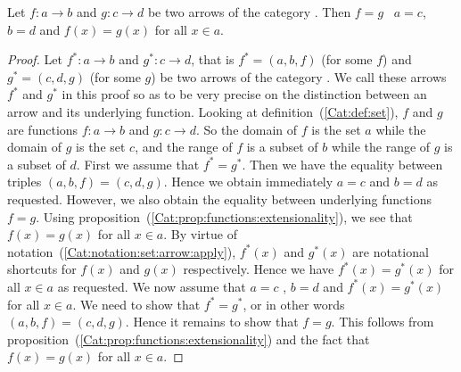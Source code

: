 \begin{prop}\label{Cat:prop:set:arrow:equal}
    Let $f:a\to b$ and $g:c\to d$ be two arrows of the category \Set. Then 
    $f=g$ \ifand\ $a=c$, $b=d$ and $f(x)=g(x)$ for all $x\in a$.
\end{prop}
\begin{proof}
    Let $f^{*}:a \to b$ and $g^{*}:c \to d$, that is $f^{*}=(a,b,f)$ 
    (for some $f$) and $g^{*}=(c,d,g)$ (for some $g$) be two arrows
    of the category \Set. We call these arrows $f^{*}$ and $g^{*}$ in
    this proof so as to be very precise on the distinction between
    an arrow and its underlying function. Looking at 
    definition~(\ref{Cat:def:set}), $f$ and $g$ are functions $f:a\to b$ 
    and $g:c\to d$. So the domain of $f$ is the set $a$ while the domain of $g$ 
    is the set $c$, and the range of $f$ is a subset of $b$ while the range of 
    $g$ is a subset of $d$. First we assume that $f^{*}=g^{*}$. Then we have 
    the equality between triples $(a,b,f)=(c,d,g)$. Hence we obtain immediately
    $a=c$ and $b=d$ as requested. However, we also obtain the equality
    between underlying functions $f=g$. Using 
    proposition~(\ref{Cat:prop:functions:extensionality}), we see
    that $f(x)=g(x)$ for all $x\in a$. By virtue of
    notation~(\ref{Cat:notation:set:arrow:apply}), $f^{*}(x)$ and 
    $g^{*}(x)$ are notational shortcuts for $f(x)$ and $g(x)$ 
    respectively. Hence we have $f^{*}(x)=g^{*}(x)$ for all $x\in a$
    as requested. We now assume that $a=c$ , $b=d$ and $f^{*}(x)=g^{*}(x)$
    for all $x\in a$. We need to show that $f^{*}=g^{*}$, or in other
    words $(a,b,f)=(c,d,g)$. Hence it remains to show that $f=g$. This
    follows from proposition~(\ref{Cat:prop:functions:extensionality}) and
    the fact that $f(x)=g(x)$ for all $x\in a$.
\end{proof}

